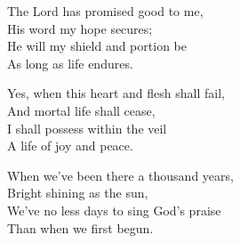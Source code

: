 \documentclass{beamer}
\begin{document}
{\begin{frame}{}
\end{frame}

\hypertarget{Amazing grace[](Newton)4}{}
\begin{frame}{}
\fontsize{ 18 }{ 23 }\selectfont

The Lord has promised good to me,\\ 
His word my hope secures;\\ 
He will my shield and portion be\\ 
As long as life endures. 

\end{frame}

\hypertarget{Amazing grace[](Newton)5}{}
\begin{frame}{}
\fontsize{ 18 }{ 23 }\selectfont

Yes, when this heart and flesh shall fail,\\ 
And mortal life shall cease,\\ 
I shall possess within the veil\\ 
A life of joy and peace. 

\end{frame}

\hypertarget{Amazing grace[](Newton)6}{}
\begin{frame}{}
\fontsize{ 18 }{ 23 }\selectfont

When we've been there a thousand years,\\ 
Bright shining as the sun,\\ 
We've no less days to sing God's praise\\ 
Than when we first begun. 

\end{frame}

}
\end{document}
